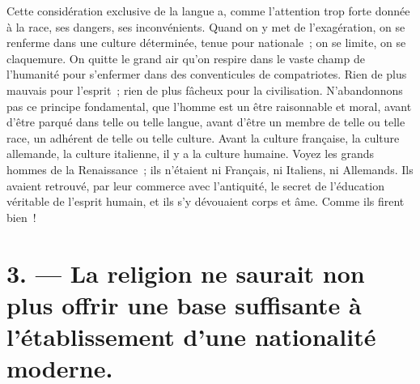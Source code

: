 \documentclass[twoside]{book} %
\begin{document}
Cette considération exclusive de la langue a, comme l’attention trop forte donnée à la race, ses dangers, ses inconvénients. Quand on y met de l’exagération, on se renferme dans une culture déterminée, tenue pour nationale ; on se limite, on se claquemure. On quitte le grand air qu’on respire dans le vaste champ de l’humanité pour s’enfermer dans des conventicules de compatriotes. Rien de plus mauvais pour l’esprit ; rien de plus fâcheux pour la civilisation. N’abandonnons pas ce principe fondamental, que l’homme est un être raisonnable et moral, avant d’être parqué dans telle ou telle langue, avant d’être un membre de telle ou telle race, un adhérent de telle ou telle culture. Avant la culture française, la culture allemande, la culture italienne, il y a la culture humaine. Voyez les grands hommes de la Renaissance ; ils n’étaient ni Français, ni Italiens, ni Allemands. Ils avaient retrouvé, par leur commerce avec l’antiquité, le secret de l’éducation véritable de l’esprit humain, et ils s’y dévouaient corps et âme. Comme ils firent bien !

\section[{3. — La religion ne saurait non plus offrir une base suffisante à l’établissement d’une nationalité moderne.}]{3. — La religion ne saurait non plus offrir une base suffisante à l’établissement d’une nationalité moderne.}
\end{document}
